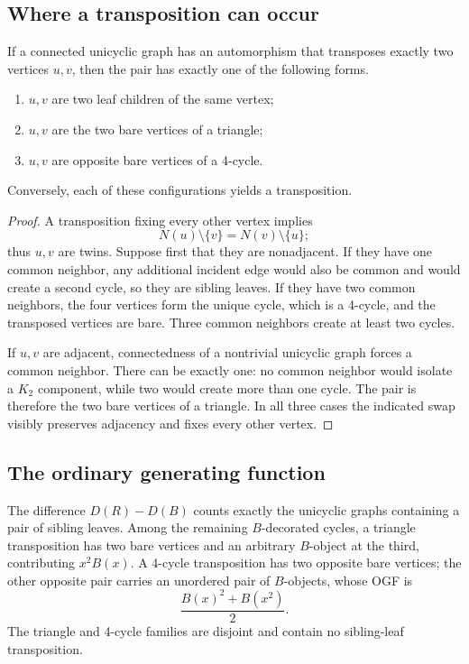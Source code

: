 \subsection{Where a transposition can occur}

\begin{lemma}
\label{lem:a006545-twins}
If a connected unicyclic graph has an automorphism that transposes exactly two
vertices \(u,v\), then the pair has exactly one of the following forms.
\begin{enumerate}
\item \(u,v\) are two leaf children of the same vertex;
\item \(u,v\) are the two bare vertices of a triangle;
\item \(u,v\) are opposite bare vertices of a 4-cycle.
\end{enumerate}
Conversely, each of these configurations yields a transposition.
\end{lemma}

\begin{proof}
A transposition fixing every other vertex implies
\[
 N(u)\setminus\{v\}=N(v)\setminus\{u\};
\]
thus \(u,v\) are twins.  Suppose first that they are nonadjacent.  If they have
one common neighbor, any additional incident edge would also be common and
would create a second cycle, so they are sibling leaves.  If they have two
common neighbors, the four vertices form the unique cycle, which is a 4-cycle,
and the transposed vertices are bare.  Three common neighbors create at least
two cycles.

If \(u,v\) are adjacent, connectedness of a nontrivial unicyclic graph forces a
common neighbor.  There can be exactly one: no common neighbor would isolate a
\(K_2\) component, while two would create more than one cycle.  The pair is
therefore the two bare vertices of a triangle.  In all three cases the indicated
swap visibly preserves adjacency and fixes every other vertex.
\end{proof}

\subsection{The ordinary generating function}

The difference \(D(R)-D(B)\) counts exactly the unicyclic graphs containing a
pair of sibling leaves.  Among the remaining \(B\)-decorated cycles, a triangle
transposition has two bare vertices and an arbitrary \(B\)-object at the third,
contributing \(x^2B(x)\).  A 4-cycle transposition has two opposite bare
vertices; the other opposite pair carries an unordered pair of \(B\)-objects,
whose OGF is
\[
 \frac{B(x)^2+B(x^2)}{2}.
\]
The triangle and 4-cycle families are disjoint and contain no sibling-leaf
transposition.

